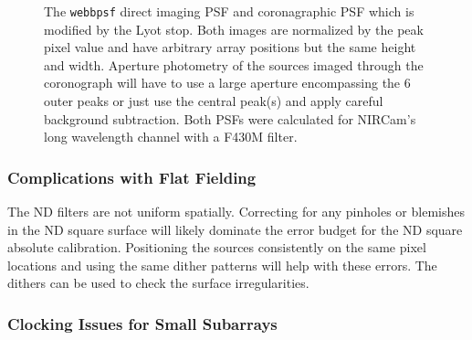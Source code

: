 \documentclass{aastex6}
\begin{document}
\begin{figure}
\centering
{}
	\caption{The \texttt{webbpsf} direct imaging PSF and coronagraphic PSF which is modified by the Lyot stop. Both images are normalized by the peak pixel value and have arbitrary array positions but the same height and width. Aperture photometry of the sources imaged through the coronograph will have to use a large aperture encompassing the 6 outer peaks or just use the central peak(s) and apply careful background subtraction. Both PSFs were calculated for NIRCam's long wavelength channel with a F430M filter.}
	\label{fig:psfComparison}
\end{figure} 

\subsubsection{Complications with Flat Fielding}
The ND filters are not uniform spatially.
Correcting for any pinholes or blemishes in the ND square surface will likely dominate the error budget for the ND square absolute calibration.
Positioning the sources consistently on the same pixel locations and using the same dither patterns will help with these errors.
The dithers can be used to check the surface irregularities.

\subsubsection{Clocking Issues for Small Subarrays}
\end{document}
